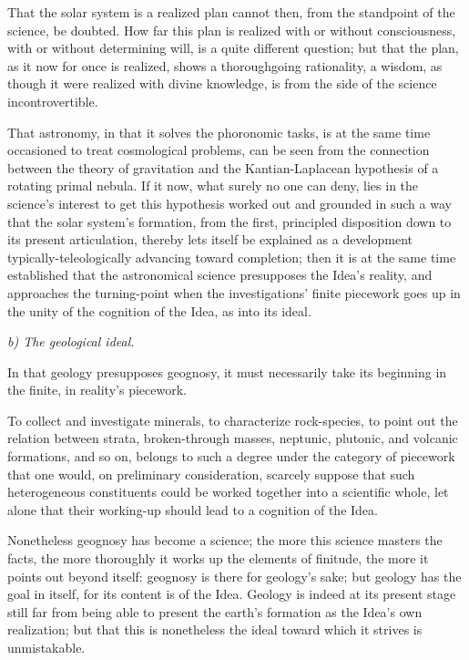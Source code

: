 \documentclass[12pt]{book}
\begin{document}
That the solar system is a realized plan cannot then, from the standpoint of the science, be doubted.
How far this plan is realized with or without consciousness, with or without determining will, is a
quite different question; but that the plan, as it now for once is realized, shows a thoroughgoing
rationality, a wisdom, as though it were realized with divine knowledge, is from the side of the science
incontrovertible.

That astronomy, in that it solves the phoronomic tasks, is at the same time occasioned to treat
cosmological problems, can be seen from the connection between the theory of gravitation and the
Kantian-Laplacean hypothesis of a rotating primal nebula. If it now, what surely no one can deny, lies in
the science's interest to get this hypothesis worked out and grounded in such a way that the solar
system's formation, from the first, principled disposition down to its present articulation, thereby lets
itself be explained as a development typically-teleologically advancing toward completion; then it is at
the same time established that the astronomical science
presupposes the Idea's reality, and approaches the turning-point when the investigations' finite
piecework goes up in the unity of the cognition of the Idea, as into its ideal.

\begin{center}\emph{b) The geological ideal.}\end{center}

In that geology presupposes geognosy, it must necessarily take its beginning in the finite, in reality's
piecework.

To collect and investigate minerals, to characterize rock-species, to point out the relation between
strata, broken-through masses, neptunic, plutonic, and volcanic formations, and so on, belongs to such a
degree under the category of piecework that one would, on preliminary consideration, scarcely suppose
that such heterogeneous constituents could be worked together into a scientific whole, let alone that
their working-up should lead to a cognition of the Idea.

Nonetheless geognosy has become a science; the more this science masters the facts, the more thoroughly
it works up the elements of finitude, the more it points out beyond itself: geognosy is there for
geology's sake; but geology has the goal in itself, for its content is of the Idea. Geology is indeed at
its present stage still far from being able to present the earth's formation as the Idea's own
realization; but that this is nonetheless the ideal toward which it strives is unmistakable.
\end{document}
